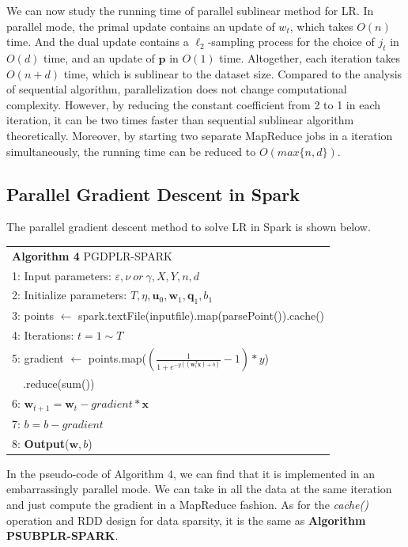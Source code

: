 \documentclass[10pt, conference, compsocconf]{IEEEtran}
\newcommand{\bw}{\mathbf{w}}
\newcommand{\bp}{\mathbf{p}}
\newcommand{\bq}{\mathbf{q}}
\newcommand{\tspace}{\hspace*{2em}}
\begin{document}
We can now study the running time of parallel sublinear method for LR.
In parallel mode, the primal update contains an update of $w_t$, which takes $O(n)$ time.
And the dual update contains a $\ell_2$-sampling process for the choice of $j_t$ in $O(d)$ time, and an update of $\bp$ in $O(1)$ time.
Altogether, each iteration takes $O(n+d)$ time, which is sublinear to the dataset size.
Compared to the analysis of sequential algorithm, parallelization does not change computational complexity.
However, by reducing the constant coefficient from 2 to 1 in each iteration, it can be two times faster than sequential sublinear algorithm theoretically.
Moreover, by starting two separate MapReduce jobs in a iteration simultaneously, the running time can be reduced to $O(max\{n,d\})$.

\subsection{Parallel Gradient Descent in Spark}
The parallel gradient descent method to solve LR in Spark is shown below.
    \begin{table}[ht]
	\begin{tabular}{l}
    \hline\noalign{\smallskip}
	\textbf{Algorithm 4} PGDPLR-SPARK \\
	\noalign{\smallskip}
	\hline
	\noalign{\smallskip}
    1:  Input parameters: $\varepsilon, \nu~or~\gamma, X, Y, n, d$ \\
    2:	Initialize parameters: $T, \eta, {\mathbf{u}}_{0}, {\bw}_{1}, {\mathbf{\bq}}_{1}, {b}_{1}$\\
    3:  points $\leftarrow$ spark.textFile(inputfile).map(parsePoint()).cache() \\
    4:  Iterations: $t=1 \sim T$ \\
    5:  \tspace gradient $\leftarrow$ points.map($(\frac{1}{1+e^{-y((\bw_t^T \textbf{x})+b)}}-1)*y$) \\
        ~~\tspace\tspace\tspace\tspace\tspace .reduce(sum()) \\
    6:  \tspace $\bw_{t+1} = \bw_t - gradient * \textbf{x}$ \\
    7:  \tspace $b = b - gradient$ \\
    8:  \textbf{Output}($\bw, b$) \\
    \hline
    \end{tabular}
	\end{table}

In the pseudo-code of Algorithm 4, we can find that it is implemented in an embarrassingly parallel mode.
We can take in all the data at the same iteration and just compute the gradient in a MapReduce fashion.
As for the \textit{cache()} operation and RDD design for data sparsity, it is the same as \textbf{Algorithm PSUBPLR-SPARK}.
\end{document}

